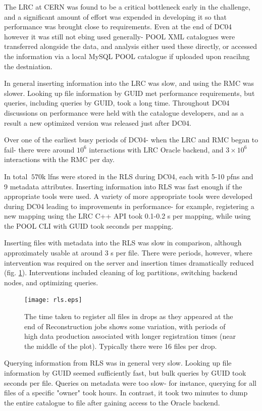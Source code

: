 \documentclass{cmspaper}
\begin{document}
The LRC at CERN was found to be a critical bottleneck early in the challenge, and a significant amount of effort was expended in developing it so that performance was brought close to requirements. Even at the end of DC04 however it was still not ebing used generally- POOL XML catalogues were transferred alongside the data, and analysis either used these directly, or accessed the information via a local MySQL POOL catalogue if uploaded upon reacihng the destniation.

In general inserting information into the LRC was slow, and using the RMC was slower. Looking up file information by GUID met performance requirements, but queries, including queries by GUID, took a long time. Throughout DC04 discussions on performance were held with the catalogue developers, and as a result a new optimized version was released just after DC04.

Over one of the earliest busy periods of DC04- when the LRC and RMC began to fail- there were around $10^6$ interactions with LRC Oracle backend, and $3\times10^6$ interactions with the RMC per day. 

In total $~570$k lfns were stored in the RLS during DC04, each with 5-10 pfns and 9 metadata attributes. Inserting information into RLS was fast enough if  the appropriate tools were used. A variety of more appropriate tools were developed during DC04 leading to improvements in performance- for example, registering a new mapping using the LRC C++ API took 0.1-0.2 s per mapping, while using the POOL CLI with GUID took seconds per mapping.

Inserting files with metadata into the RLS was slow in comparison, although approximately usable at around 3 s per file. There were periods, however, where intervention was required on the server and insertion times dramatically reduced (fig. \ref{fig:rls}). Interventions included cleaning of log partitions, switching backend nodes, and optimizing queries.

\begin{figure}[tbp]
\centering
\texttt{[image: rls.eps]}
\label{fig:rls}
\caption{The time taken to register all files in drops as they appeared at the end of Reconstruction jobs shows some variation, with periods of high data production associated with longer registration times (near the middle of the plot). Typically there were 16 files per drop.}
\end{figure} 

Querying information from RLS was in general very slow. Looking up file information by GUID seemed sufficiently fast, but bulk queries by GUID took seconds per file. Queries on metadata were too slow- for instance, querying for all files of a specific "owner" took hours. In contrast, it took two minutes to dump the entire catalogue to file after gaining access to the Oracle backend.
\end{document}
